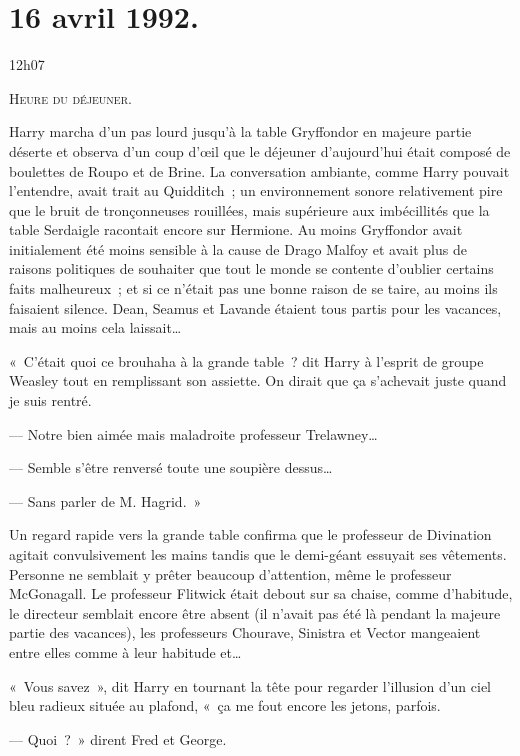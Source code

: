 
\section{16 avril 1992.}

12h07

\lettrine{H}{eure du déjeuner.}

\hplettrineextrapara
Harry marcha d'un pas lourd jusqu'à la table Gryffondor en majeure partie déserte et observa d'un coup d'œil que le déjeuner d'aujourd'hui était composé de boulettes de Roupo et de Brine.
La conversation ambiante, comme Harry pouvait l'entendre, avait trait au Quidditch~; un environnement sonore relativement pire que le bruit de tronçonneuses rouillées, mais supérieure aux imbécillités que la table Serdaigle racontait encore sur Hermione.
Au moins Gryffondor avait initialement été moins sensible à la cause de Drago Malfoy et avait plus de raisons politiques de souhaiter que tout le monde se contente d'oublier certains faits malheureux~; et si ce n'était pas une bonne raison de se taire, au moins ils faisaient silence.
Dean, Seamus et Lavande étaient tous partis pour les vacances, mais au moins cela laissait…

«~C'était quoi ce brouhaha à la grande table~? dit Harry à l'esprit de groupe Weasley tout en remplissant son assiette.
On dirait que ça s'achevait juste quand je suis rentré.

--- Notre bien aimée mais maladroite professeur Trelawney…

--- Semble s'être renversé toute une soupière dessus…

--- Sans parler de M. Hagrid.~»

Un regard rapide vers la grande table confirma que le professeur de Divination agitait convulsivement les mains tandis que le demi-géant essuyait ses vêtements.
Personne ne semblait y prêter beaucoup d'attention, même le professeur McGonagall.
Le professeur Flitwick était debout sur sa chaise, comme d'habitude, le directeur semblait encore être absent (il n'avait pas été là pendant la majeure partie des vacances), les professeurs Chourave, Sinistra et Vector mangeaient entre elles comme à leur habitude et…

«~Vous savez~», dit Harry en tournant la tête pour regarder l'illusion d'un ciel bleu radieux située au plafond, «~ça me fout encore les jetons, parfois.

--- Quoi~?~»
dirent Fred et George.

